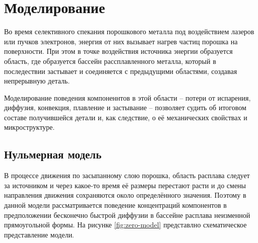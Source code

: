 \section{Моделирование}

Во время селективного спекания порошкового металла под воздействием лазеров или пучков электронов, энергия от них вызывает нагрев частиц порошка на поверхности. 
При этом в точке воздействия источника энергии образуется область, где образуется бассейн рассплавленного металла, который в последествии застывает и соединяется с предыдущими областями, создавая непрерывную деталь.

Моделирование поведения компоненнтов в этой области -- потери от испарения, диффузия, конвекция, плавление и застывание -- позволяет судить об итоговом составе получившейся детали и, как следствие, о её механических свойствах и микроструктуре.

\subsection{Нульмерная модель}

В процессе движения по засыпанному слою порошка, область расплава следует за источником и через какое-то время её размеры перестают расти и до смены направления движения сохраняются около определённого значения. 
Поэтому в данной модели рассматривается поведение концентраций компонентов в предположении бесконечно быстрой диффузии в бассейне расплава неизменной 
прямоугольной формы. На рисунке \ref{fig:zero-model} представлно схематическое представление модели.


\clearpage